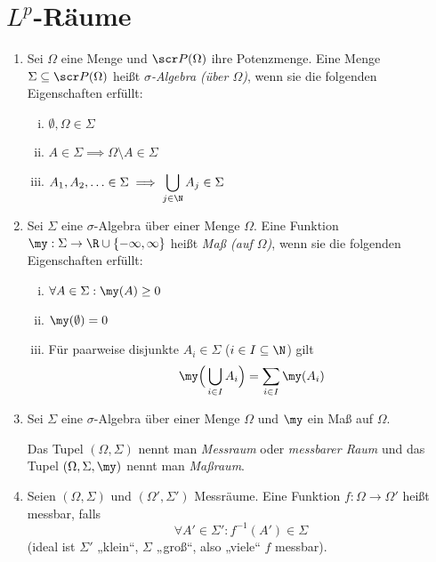 
\chapter{\texorpdfstring{$L^p$}{Lp}-Räume}


\begin{df} \label{2.1}
	\begin{enumerate}[1)]
		\item
			Sei $\Omega$ eine Menge und $\scr P(\Omega)$ ihre Potenzmenge.
			Eine Menge $\Sigma \subset \scr P(\Omega)$ heißt \emph{$\sigma$-Algebra (über $\Omega$)}, wenn sie die folgenden Eigenschaften erfüllt:
			\begin{enumerate}[(i)]
				\item
					$\displaystyle \emptyset, \Omega \in \Sigma$
				\item
					$\displaystyle A \in \Sigma \implies \Omega \setminus A \in \Sigma$
				\item
					$\displaystyle A_1, A_2, \dotsc \in \Sigma \implies \bigcup_{j\in \N} A_j \in \Sigma$
			\end{enumerate}
		\item
			Sei $\Sigma$ eine $\sigma$-Algebra über einer Menge $\Omega$.
			Eine Funktion $\my : \Sigma \to \R \cup \{-\infty, \infty\}$ heißt \emph{Maß (auf $\Omega$)}, wenn sie die folgenden Eigenschaften erfüllt:
			\begin{enumerate}[(i)]
				\item
					$\displaystyle \forall A \in \Sigma : \my(A) \ge 0$
				\item
					$\displaystyle \my(\emptyset) = 0$
				\item
					Für paarweise disjunkte $A_i \in \Sigma$ ($i \in I \subset \N$) gilt
					\[
						\my\Big(\bigcup_{i\in I} A_i\Big) = \sum_{i \in I} \my(A_i)
					\]
			\end{enumerate}
		\item
			Sei $\Sigma$ eine $\sigma$-Algebra über einer Menge $\Omega$ und $\my$ ein Maß auf $\Omega$.

			Das Tupel $(\Omega, \Sigma)$ nennt man \emph{Messraum} oder \emph{messbarer Raum} und das Tupel $(\Omega, \Sigma, \my)$ nennt man \emph{Maßraum}.
		\item
			Seien $(\Omega, \Sigma)$ und $(\Omega', \Sigma')$ Messräume.
			Eine Funktion $f: \Omega \to \Omega'$ heißt messbar, falls
			\[
				\forall A' \in \Sigma' : f^{-1}(A') \in \Sigma
			\]
			(ideal ist $\Sigma'$ „klein“, $\Sigma$ „groß“, also „viele“ $f$ messbar).
	\end{enumerate}
\end{df}

